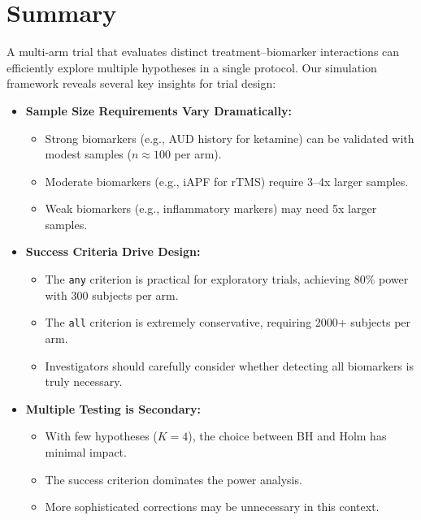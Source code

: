 \documentclass[11pt]{article}
\begin{document}
\pagebreak
\section{Summary}

A multi-arm trial that evaluates distinct treatment--biomarker interactions can efficiently explore multiple hypotheses in a single protocol. Our simulation framework reveals several key insights for trial design:

\begin{itemize}
\item \textbf{Sample Size Requirements Vary Dramatically:}
  \begin{itemize}
  \item Strong biomarkers (e.g., AUD history for ketamine) can be validated with modest samples ($n\approx 100$ per arm).
  \item Moderate biomarkers (e.g., iAPF for rTMS) require 3--4x larger samples.
  \item Weak biomarkers (e.g., inflammatory markers) may need 5x larger samples.
  \end{itemize}

\item \textbf{Success Criteria Drive Design:}
  \begin{itemize}
  \item The \texttt{any} criterion is practical for exploratory trials, achieving 80\% power with 300 subjects per arm.
  \item The \texttt{all} criterion is extremely conservative, requiring 2000+ subjects per arm.
  \item Investigators should carefully consider whether detecting all biomarkers is truly necessary.
  \end{itemize}

\item \textbf{Multiple Testing is Secondary:}
  \begin{itemize}
  \item With few hypotheses ($K=4$), the choice between BH and Holm has minimal impact.
  \item The success criterion dominates the power analysis.
  \item More sophisticated corrections may be unnecessary in this context.
  \end{itemize}
\end{itemize}
\end{document}
